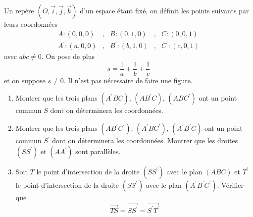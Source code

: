 Un repère $(O,\overrightarrow{i},\overrightarrow{j},\overrightarrow{k})$ d'un espace étant fixé, on définit les points suivants par leurs coordonnées
\begin{align*}
 A:(0,0,0) &,& B:(0,1,0) &,& C:(0,0,1) \\
A^\prime:(a,0,0) &,& B^\prime:(b,1,0) &,& C^\prime:(c,0,1) 
\end{align*}
avec $abc\neq0$. On pose de plus
\begin{displaymath}
 s = \frac{1}{a}+\frac{1}{b}+\frac{1}{c}
\end{displaymath}
et on suppose $s\neq 0$. Il n'est pas nécessaire de  faire une figure.
\begin{enumerate}
 \item Montrer que les trois plans $(A^\prime BC)$, $(AB^\prime C)$, $(ABC^\prime )$ ont un point commun $S$ dont on déterminera les coordonnées.
\item Montrer que les trois plans $(AB^\prime C^\prime )$, $(A^\prime B C^\prime )$, $(A^\prime B^\prime C)$ ont un point commun $S^\prime $ dont on déterminera les coordonnées. Montrer que les droites $(SS^\prime )$ et $(AA^\prime )$ sont parallèles.
\item Soit $T$ le point d'intersection de la droite $(SS^\prime)$ avec le plan $(ABC)$ et $T^\prime $ le point d'intersection de la droite $(SS^\prime)$ avec le plan $(A^\prime B^\prime C^\prime )$. Vérifier que 
\begin{displaymath}
 \overrightarrow{TS} = \overrightarrow{SS^\prime } = \overrightarrow{S^\prime T^\prime }
\end{displaymath}

\end{enumerate}
